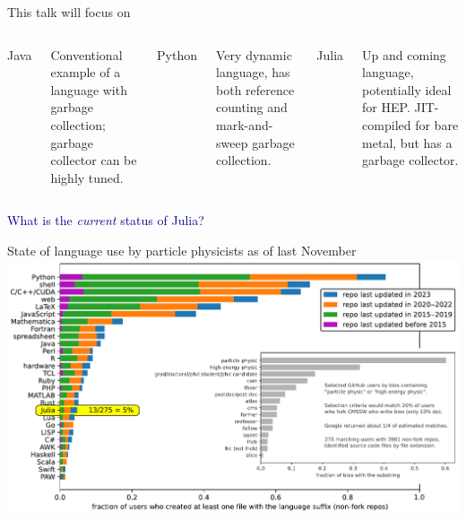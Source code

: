 \documentclass[aspectratio=169]{beamer}
\begin{document}
\begin{frame}{This talk will focus on}
\begin{columns}[t]


\Huge
Java

\vspace{0.5 cm}
\large
Conventional example of a language with garbage collection; garbage collector can be highly tuned.


\Huge
Python

\vspace{0.5 cm}
\large
Very dynamic language, has both reference counting and mark-and-sweep garbage collection.


\Huge
Julia

\vspace{0.5 cm}
\large
Up and coming language, potentially ideal for HEP. JIT-compiled for bare metal, but has a garbage collector.

\end{columns}
\end{frame}

\begin{frame}{}
\LARGE
\begin{center}
\textcolor{darkblue}{What is the {\it current} status of Julia?}
\end{center}
\end{frame}

\begin{frame}{State of language use by particle physicists as of last November}
\vspace{0.2 cm}
\includegraphics[width=\linewidth]{physicist-languages-presentation.pdf}
\end{frame}
\end{document}
